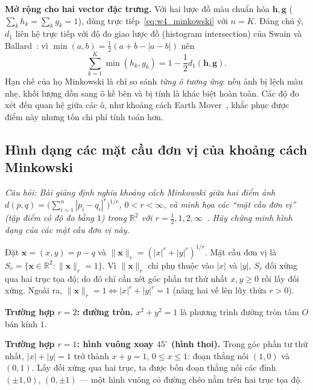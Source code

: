 \textbf{Mở rộng cho hai vector đặc trưng.} Với hai lược đồ màu chuẩn hóa $\mathbf{h}, \mathbf{g}$ ($\sum_k h_k = \sum_k g_k = 1$), dùng trực tiếp~\eqref{eq:w4_minkowski} với $n = K$. Đáng chú ý, $d_1$ liên hệ trực tiếp với độ đo giao lược đồ (histogram intersection) của Swain và Ballard~\citep{swain1991color}: vì $\min(a, b) = \frac{1}{2}(a + b - |a - b|)$ nên
\begin{equation}
\sum_{k=1}^{K} \min(h_k, g_k) = 1 - \frac{1}{2} d_1(\mathbf{h}, \mathbf{g}).
\end{equation}
Hạn chế của họ Minkowski là chỉ so sánh \emph{từng ô tương ứng}: nếu ảnh bị lệch màu nhẹ, khối lượng dồn sang ô kế bên và bị tính là khác biệt hoàn toàn. Các độ đo xét đến quan hệ giữa các ô, như khoảng cách Earth Mover~\citep{rubner2000earth}, khắc phục được điểm này nhưng tốn chi phí tính toán hơn.

\subsection{Hình dạng các mặt cầu đơn vị của khoảng cách Minkowski}
\label{subsec:w4_slide23}

\textit{Câu hỏi: Bài giảng định nghĩa khoảng cách Minkowski giữa hai điểm ảnh $d(p, q) = \big(\sum_{i=1}^{n} |p_i - q_i|^r\big)^{1/r}$, $0 < r < \infty$, và minh họa các ``mặt cầu đơn vị'' (tập điểm có độ đo bằng $1$) trong $\mathbb{R}^2$ với $r = \tfrac12, 1, 2, \infty$~\citep{xlav_lec2}. Hãy chứng minh hình dạng của các mặt cầu đơn vị này.}

Đặt $\mathbf{x} = (x, y) = p - q$ và $\|\mathbf{x}\|_r = (|x|^r + |y|^r)^{1/r}$. Mặt cầu đơn vị là $S_r = \{\mathbf{x} \in \mathbb{R}^2 : \|\mathbf{x}\|_r = 1\}$. Vì $\|\mathbf{x}\|_r$ chỉ phụ thuộc vào $|x|$ và $|y|$, $S_r$ đối xứng qua hai trục tọa độ; do đó chỉ cần xét góc phần tư thứ nhất $x, y \ge 0$ rồi lấy đối xứng. Ngoài ra, $\|\mathbf{x}\|_r = 1 \iff |x|^r + |y|^r = 1$ (nâng hai vế lên lũy thừa $r > 0$).

\textbf{Trường hợp $r = 2$: đường tròn.} $x^2 + y^2 = 1$ là phương trình đường tròn tâm $O$ bán kính $1$.

\textbf{Trường hợp $r = 1$: hình vuông xoay $45^\circ$ (hình thoi).} Trong góc phần tư thứ nhất, $|x| + |y| = 1$ trở thành $x + y = 1$, $0 \le x \le 1$: đoạn thẳng nối $(1, 0)$ và $(0, 1)$. Lấy đối xứng qua hai trục, ta được bốn đoạn thẳng nối các đỉnh $(\pm 1, 0)$, $(0, \pm 1)$ — một hình vuông có đường chéo nằm trên hai trục tọa độ.

